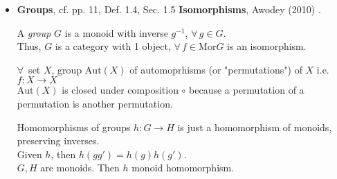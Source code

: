 \documentclass[10pt]{amsart}
\begin{document}
\begin{multicols*}{2}
\begin{itemize}
For \texttt{int}, $\exists \, $ constant $0:1 \to \texttt{int}$, consider $\texttt{succ}:\texttt{int} \to \texttt{int} \in \text{Hom}(\texttt{int}, \texttt{int})$, \\
For \texttt{bool}, $\exists \, $ constants $\texttt{true} : 1 \to \texttt{bool}$, $\texttt{false} : 1 \to \texttt{bool}$; consider $\neg \in \text{Hom}(\texttt{bool}, \texttt{bool})$, s.t.
\[
\begin{aligned}
& \neg \circ \texttt{true} = \texttt{false} \\ 
& \neg \circ \texttt{false} = \texttt{true} 
\end{aligned}
\]

For \texttt{char}, $\exists \, $ constants $c:1 \to \texttt{char}$, \, $\forall \, \texttt{char} c$.

Since $\forall \, T,U \in \text{Obj}(\mathbf{C}(L))$, $\exists \, \text{Hom}(T,U) \subseteq \text{Mor}\mathbf{C}(L)$. So consider $\texttt{ord}:\texttt{char} \to \texttt{int}$, $\texttt{chr}: \texttt{int} \to \texttt{char}$, s.t. 
\[
\texttt{char} \circ \texttt{ord} = 1_{\texttt{char}}
\]

So $\text{Obj}\mathbf{C}(L) = \lbrace \texttt{int}, \texttt{bool}, \texttt{char}, 1 \rbrace$, \\
\phantom{So } $\text{Mor}\mathbf{C}(L)$ consists of all programs.

See 5.3.14 Record Types and 5.7.6, 14.2 for flow of control in Barr and Wells (2012) \cite{BaWe2012} to complete the programming language. For here, see section \ref{SubSubSect:RecordTypesProduct}

\item \textbf{Groups}, cf. pp. 11, Def. 1.4, Sec. 1.5 \textbf{Isomorphisms}, Awodey (2010) \cite{Awod2010}.

A \emph{group} $G$ is a monoid with inverse $g^{-1}$, $\forall \, g \in G$. \\
Thus, $G$ is a category with 1 object, $\forall \, f \in \text{Mor}G$ is an isomorphism.

$\forall \, $ set $X$, group $\text{Aut}(X)$ of automoprhisms (or "permutations") of $X$ i.e. $f:X\to X$ \\
$\text{Aut}(X)$ is closed under composition $\circ$ because a permutation of a permutation is another permutation.

Homomorphisms of groups $h: G\to H$ is just a homomorphism of monoids, preserving inverses.\\
Given $h$, then $h(gg') = h(g) h(g')$. \\
$G,H$ are monoids. Then $h$ monoid homomorphism.
\end{itemize}


\end{multicols*}
\end{document}
